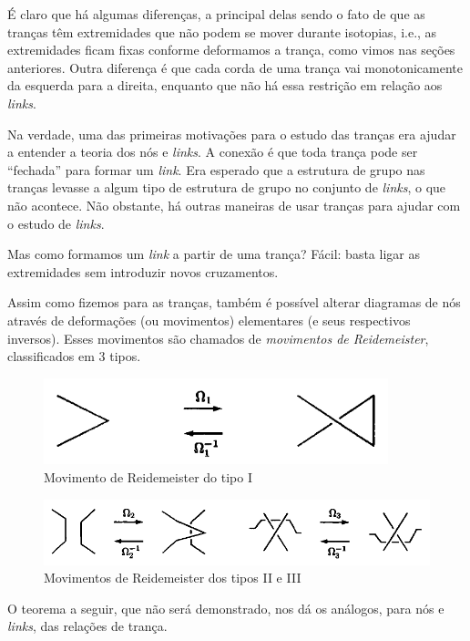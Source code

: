 	\par\vspace{0.3cm} É claro que há algumas diferenças, a principal delas sendo o fato de que as tranças têm extremidades que não podem se mover durante isotopias, i.e., as extremidades ficam fixas conforme deformamos a trança, como vimos nas seções anteriores. Outra diferença é que cada corda de uma trança vai monotonicamente da esquerda para a direita, enquanto que não há essa restrição em relação aos \textit{links}. 
	\par\vspace{0.3cm} Na verdade, uma das primeiras motivações para o estudo das tranças era ajudar a entender a teoria dos nós e \textit{links}. A conexão é que toda trança pode ser ``fechada'' para formar um \textit{link}. Era esperado que a estrutura de grupo nas tranças levasse a algum tipo de estrutura de grupo no conjunto de \textit{links}, o que não acontece. Não obstante, há outras maneiras de usar tranças para ajudar com o estudo de \textit{links}.
	\par\vspace{0.3cm} Mas como formamos um \textit{link} a partir de uma trança? Fácil: basta ligar as extremidades sem introduzir novos cruzamentos.
	\par\vspace{0.3cm} Assim como fizemos para as tranças, também é possível alterar diagramas de nós através de deformações (ou movimentos) elementares (e seus respectivos inversos). Esses movimentos são chamados de \textit{movimentos de Reidemeister}, classificados em 3 tipos.
	
	\begin{figure}[H]
		\begin{center}
			\includegraphics[width=10cm]{Images/reidemeister_1.png}
		\end{center}\caption{Movimento de Reidemeister do tipo I}
		\label{reidemeister tipo 1}
	\end{figure}
	
	\begin{figure}[H]
		\begin{center}
			\includegraphics[width=14cm]{Images/reidemeister_2_e_3.png}
		\end{center}\caption{Movimentos de Reidemeister dos tipos II e III}
		\label{reidemeister tipos 2 e 3}
	\end{figure}
	\par\vspace{0.3cm} O teorema a seguir, que não será demonstrado, nos dá os análogos, para nós e \textit{links}, das relações de trança.
	
